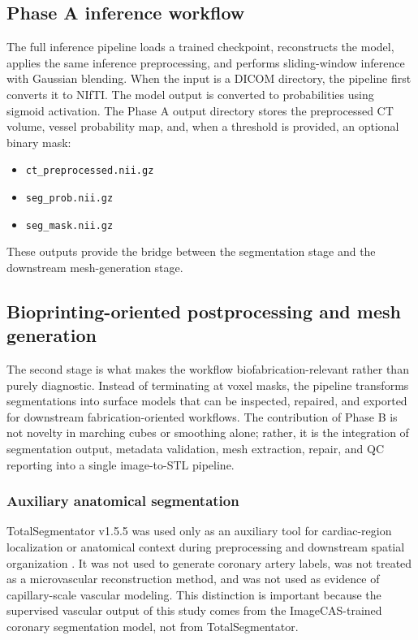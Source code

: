 \documentclass[anonymous]{iopjournal}
\begin{document}
\FloatBarrier

\subsection{Phase A inference workflow}

The full inference pipeline loads a trained checkpoint, reconstructs the model, applies the same inference preprocessing, and performs sliding-window inference with Gaussian blending. When the input is a DICOM directory, the pipeline first converts it to NIfTI. The model output is converted to probabilities using sigmoid activation. The Phase A output directory stores the preprocessed CT volume, vessel probability map, and, when a threshold is provided, an optional binary mask:
\begin{itemize}
    \item \texttt{ct\_preprocessed.nii.gz}
    \item \texttt{seg\_prob.nii.gz}
    \item \texttt{seg\_mask.nii.gz}
\end{itemize}
These outputs provide the bridge between the segmentation stage and the downstream mesh-generation stage.

\subsection{Bioprinting-oriented postprocessing and mesh generation}

The second stage is what makes the workflow biofabrication-relevant rather than purely diagnostic. Instead of terminating at voxel masks, the pipeline transforms segmentations into surface models that can be inspected, repaired, and exported for downstream fabrication-oriented workflows. The contribution of Phase B is not novelty in marching cubes or smoothing alone; rather, it is the integration of segmentation output, metadata validation, mesh extraction, repair, and QC reporting into a single image-to-STL pipeline.

\subsubsection{Auxiliary anatomical segmentation}

TotalSegmentator v1.5.5 was used only as an auxiliary tool for cardiac-region localization or anatomical context during preprocessing and downstream spatial organization \cite{wasserthal2023}. It was not used to generate coronary artery labels, was not treated as a microvascular reconstruction method, and was not used as evidence of capillary-scale vascular modeling. This distinction is important because the supervised vascular output of this study comes from the ImageCAS-trained coronary segmentation model, not from TotalSegmentator.
\end{document}
